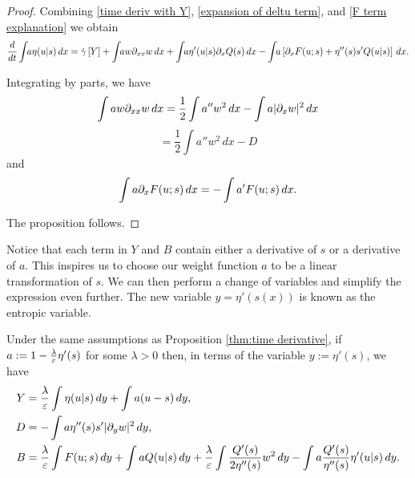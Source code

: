 \begin{proof}
Combining \eqref{time deriv with Y}, \eqref{expansion of deltu term}, and \eqref{F term explanation} we obtain
\[ \ddt \int\!\! a \eta(u|s) \,dx = \dot{\gamma}\bracket{Y}
+ \int\!\! a w \del_{xx} w \,dx 
+ \int\!\! a \eta'(u|s) \del_x Q(s) \,dx
- \int\!\! a \left[ \del_x F(u;s) + \eta''(s)s'Q(u|s) \right] \,dx. \]

Integrating by parts, we have
\[ \int a w \partial_{xx} w \,dx = \frac{1}{2} \int a'' w^2 \,dx - \int a |\partial_x w|^2 \,dx \]
\[ = \frac{1}{2} \int a'' w^2 \,dx - D \]
and
\[ \int a \partial_x F(u;s) \,dx = - \int a' F(u;s) \,dx. \]

The proposition follows.  

\end{proof}


Notice that each term in $Y$ and $B$ contain either a derivative of $s$ or a derivative of $a$.  This inspires us to choose our weight function $a$ to be a linear transformation of $s$.  We can then perform a change of variables and simplify the expression even further.  The new variable $y = \eta'(s(x))$ is known as the entropic variable.  

\begin{lemma} \label{thm:rewrite time derivative}
Under the same assumptions as Proposition \ref{thm:time derivative}, if $a := 1 - \frac{\lambda}{\varepsilon} \eta'(s)$ for some $\lambda > 0$ then, in terms of the variable $y := \eta'(s)$, we have
\begin{align*} 
Y &= \frac{\lambda}{\varepsilon} \int \eta(u|s) \,dy + \int a (u-s) \,dy, \\
D &= -\int a \eta''(s) s' |\partial_y w|^2 \,dy, \\
B &= \frac{\lambda}{\varepsilon} \int F(u;s) \,dy + \int a Q(u|s) \,dy + \frac{\lambda}{\varepsilon}\int \frac{Q'(s)}{2\eta''(s)} w^2 \,dy - \int a \frac{Q'(s)}{\eta''(s)} \eta'(u|s) \,dy. 
\end{align*}
\end{lemma}


